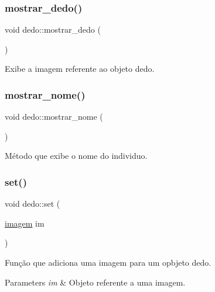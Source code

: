 \subsubsection{\texorpdfstring{mostrar\+\_\+dedo()}{mostrar\_dedo()}}
{\footnotesize\ttfamily void dedo\+::mostrar\+\_\+dedo (\begin{DoxyParamCaption}{ }\end{DoxyParamCaption})}



Exibe a imagem referente ao objeto dedo. 

\mbox{\label{classdedo_a098e4c93dfd50b699abac9a415327f2a}} 
\subsubsection{\texorpdfstring{mostrar\+\_\+nome()}{mostrar\_nome()}}
{\footnotesize\ttfamily void dedo\+::mostrar\+\_\+nome (\begin{DoxyParamCaption}{ }\end{DoxyParamCaption})}



Método que exibe o nome do individuo. 

\mbox{\label{classdedo_a6ef2d247e9e0710c9d55777cd5b5b929}} 
\subsubsection{\texorpdfstring{set()}{set()}}
{\footnotesize\ttfamily void dedo\+::set (\begin{DoxyParamCaption}\item[{\mbox{\hyperlink{classimagem}{imagem}}}]{im }\end{DoxyParamCaption})}



Função que adiciona uma imagem para um opbjeto dedo. 


\begin{DoxyParams}{Parameters}
{\em im} & Objeto referente a uma imagem. \\
\hline
\end{DoxyParams}
\mbox{\label{classdedo_a40f9f9b467d878f95691665d8c18d005}} 
